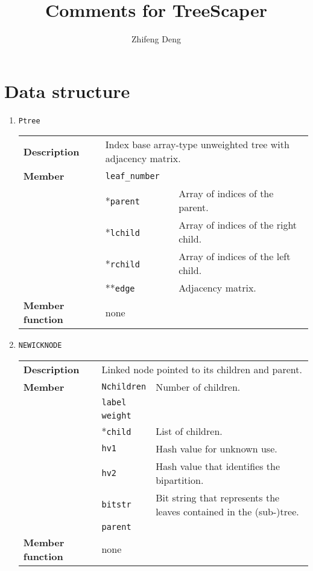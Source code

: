 \documentclass[11pt,a4paper]{article}
\title{Comments for TreeScaper}
\author{Zhifeng Deng}
\newcommand{\mrref}[1]{\texttt{#1}\label{#1}}
\newcommand{\mmemref}[2]{\texttt{#1}\label{#2#1}}
\newcommand{\mtref}[2]{\texttt{#1}\label{#2}}
\theoremstyle{definition}
\theoremstyle{definition}
\numberwithin{equation}{section}
\begin{document}
	\maketitle
	
	\section*{Data structure}
	
	\begin{enumerate}
		\item \mrref{Ptree}
		
			\begin{tabular}{>{\bfseries}lp{}p{}}
				Description & \multicolumn{2}{p{0.8\textwidth}}{Index base array-type unweighted tree with adjacency matrix.} \\
				Member & \mtref{leaf\_number}{leafnumber} &\\
				&*\mmemref{parent}{Ptree} & Array of indices of the parent.\\
				&*\mmemref{lchild}{Ptree} & Array of indices of the right child.\\
				&*\mmemref{rchild}{Ptree} & Array of indices of the left child.\\
				&**\mmemref{edge}{Ptree}  & Adjacency matrix.\\
				Member function& none &  \\
			\end{tabular}
		
		\item \mrref{NEWICKNODE}
		
			\begin{tabular}{>{\bfseries}lp{}p{}}
				Description & \multicolumn{2}{p{0.6\textwidth}}{Linked node pointed to its children and parent.} \\
				Member & \mmemref{Nchildren}{NEWICKNODE}  & Number of children.\\
				& \mmemref{label}{NEWICKNODE} &\\
				& \mmemref{weight}{NEWICKNODE} &\\
				& *\mmemref{child}{NEWICKNODE} & List of children.\\
				& \mmemref{hv1}{NEWICKNODE} & Hash value for unknown use.\\
				& \mmemref{hv2}{NEWICKNODE} & Hash value that identifies the bipartition.\\
				& \mmemref{bitstr}{NEWICKNODE} & Bit string that represents the leaves contained in the (sub-)tree.\\
				& \mmemref{parent}{NEWICKNODE} & \\
				Member function& none  &  \\
			\end{tabular}


\end{enumerate}
\end{document}
